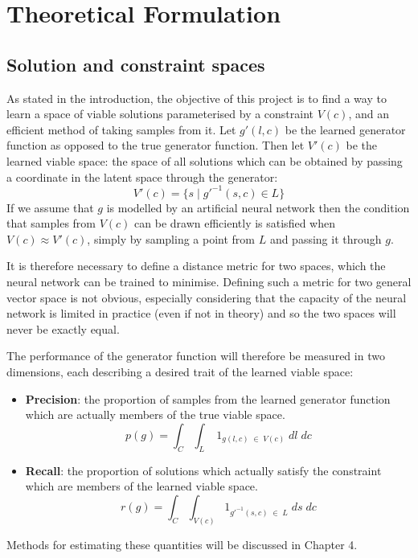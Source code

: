 \documentclass[../../main.tex]{subfiles}
\begin{document}
\chapter{Theoretical Formulation} \label{chapter:theoreticalFormulation}

\section{Solution and constraint spaces} \label{section:solutionAndConstraintSpaces}

As stated in the introduction, the objective of this project is to find a way to learn a space of viable solutions parameterised by a constraint $V(c)$, and an efficient method of taking samples from it.
Let $g'(l, c)$ be the learned generator function as opposed to the true generator function.
Then let $V'(c)$ be the learned viable space: the space of all solutions which can be obtained by passing a coordinate in the latent space through the generator:
$$V'(c) = \{s \; | \; g'^{-1}(s, c) \in L\}$$
If we assume that $g$ is modelled by an artificial neural network then the condition that samples from $V(c)$ can be drawn efficiently is satisfied when $V(c) \approx V'(c)$, simply by sampling a point from $L$ and passing it through $g$.

It is therefore necessary to define a distance metric for two spaces, which the neural network can be trained to minimise.
Defining such a metric for two general vector space is not obvious, especially considering that the capacity of the neural network is limited in practice (even if not in theory) and so the two spaces will never be exactly equal.

The performance of the generator function will therefore be measured in two dimensions, each describing a desired trait of the learned viable space:
\begin{itemize}
    \item[] \textbf{Precision}: the proportion of samples from the learned generator function which are actually members of the true viable space.
    $$p(g) = \int_{C}\int_{L} \; 1_{g(l, c) \; \in \; V(c)} \; dl \; dc$$ 
    \item[] \textbf{Recall}: the proportion of solutions which actually satisfy the constraint which are members of the learned viable space.
    $$r(g) = \int_{C}\int_{V(c)} 1_{g'^{-1}(s, c) \; \in \; L} \; ds \; dc$$ 
\end{itemize}
Methods for estimating these quantities will be discussed in Chapter 4.
\end{document}
